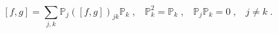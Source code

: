 \begin{equation}
\left[  f,g\right]  =\sum_{j,k}\mathbb{P}_{j}\left(  \left[  f,g\right]
\right)  _{jk}\mathbb{P}_{k}\;,\;\;\;\mathbb{P}_{k}^{2}=\mathbb{P}%
_{k}\;,\;\;\;\mathbb{P}_{j}\mathbb{P}_{k}=0\;,\;\;\;j\neq k\;.
\end{equation}

